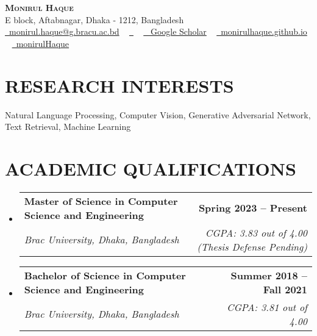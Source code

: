 \documentclass[letterpaper,10.5pt]{article}
\makeatletter
\newcommand{\resumeSubheading}[4]{
  \vspace{-2pt}\item
    \begin{tabular*}{1.0\textwidth}[t]{l@{\extracolsep{\fill}}r}
      \textbf{#1} & \textbf{\small #2} \\
      \textit{\small#3} & \textit{\small #4} \\
    \end{tabular*}\vspace{-7pt}
}
\newcommand{\resumeSubHeadingListStart}{\begin{itemize}[leftmargin=0.0in, label={}]}
\newcommand{\resumeSubHeadingListEnd}{\end{itemize}}
\makeatother
\begin{document}

\begin{center}
  {\textbf{\Huge \scshape Monirul Haque}}  \\ \vspace{0.08in}
  E block, Aftabnagar, Dhaka - 1212, Bangladesh \\ \vspace{1pt}
  \href{mailto:monirul.haque@g.Bracu.ac.bd}{\raisebox{-0.05\height}\faEnvelope\  \color{NavyBlue}monirul.haque@g.bracu.ac.bd} ~
  \href{https://www.linkedin.com/in/monirulhaq/}{\raisebox{-0.05\height} \faLinkedin\ \color{NavyBlue}{monirulhaq}}  ~
  \href{https://scholar.google.com/citations?user=PfjUg1UAAAAJ&hl=en&oi=sra}{\raisebox{-0.05\height}\faGraduationCap\  \color{NavyBlue} Google Scholar} ~
  \href{https://monirulhaque.github.io/}{\raisebox{-0.05\height}\faHome\ \color{NavyBlue}monirulhaque.github.io}  ~
  \href{https://github.com/monirulHaque}{\raisebox{-0.05\height}\faGithub\ \color{NavyBlue}monirulHaque}  ~


  \vspace{-6pt}
\end{center}

\section{RESEARCH INTERESTS}
Natural Language Processing, Computer Vision, Generative Adversarial Network, Text Retrieval, Machine Learning

\vspace{-6pt}

\section{ACADEMIC QUALIFICATIONS}
\resumeSubHeadingListStart
\resumeSubheading
{Master of Science in Computer Science and Engineering}{Spring 2023 -- Present}
{Brac University, Dhaka, Bangladesh}{CGPA: 3.83 out of 4.00 (Thesis Defense Pending)}
\resumeSubheading
{Bachelor of Science in Computer Science and Engineering}{Summer 2018 -- Fall 2021}
{Brac University, Dhaka, Bangladesh}{CGPA: 3.81 out of 4.00}
\resumeSubHeadingListEnd
\end{document}
